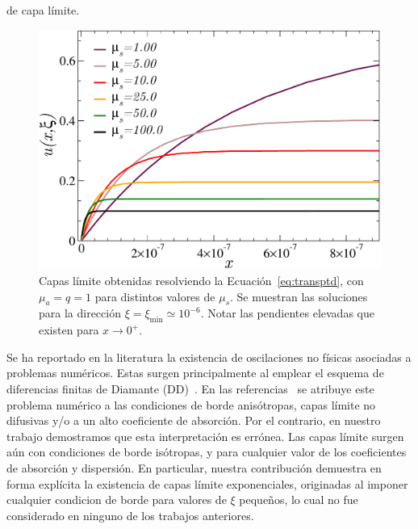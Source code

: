 de capa límite.
\begin{figure}[h!]
\centering
  \includegraphics[width=0.5\linewidth]{figuras/blayers.pdf}
  \caption{Capas límite obtenidas resolviendo la Ecuación~\eqref{eq:transptd}, 
  con $\mu_a=q=1$ para distintos valores de $\mu_s$. 
  Se muestran las soluciones para la dirección $\xi=\xi_{\text{min}} \simeq 10^{-6}$. 
  Notar las pendientes elevadas que existen para $x\to 0^+$.}
 \label{fig:blayers}
\end{figure}
Se ha reportado en la literatura la existencia 
de oscilaciones no físicas 
asociadas a problemas numéricos. 
Estas surgen principalmente al emplear el esquema de 
diferencias finitas de Diamante (DD)~\cite{Larsen1987,Petrovic1996,Bal2001}.
En las referencias~\cite{Larsen1987,Petrovic1996} se atribuye 
este problema numérico a las condiciones de borde anisótropas, capas límite no difusivas y/o 
a un alto coeficiente de absorción. Por el contrario, 
en nuestro trabajo demostramos que esta interpretación es errónea. 
Las capas límite surgen aún con condiciones de borde isótropas, 
y para cualquier valor 
de los coeficientes de absorción y dispersión. En particular, 
nuestra contribución demuestra en forma explícita la existencia 
de capas límite exponenciales, originadas al imponer cualquier 
condicion de borde para valores de  $\xi$ 
pequeños, lo cual no fue considerado en ninguno de los trabajos anteriores.


